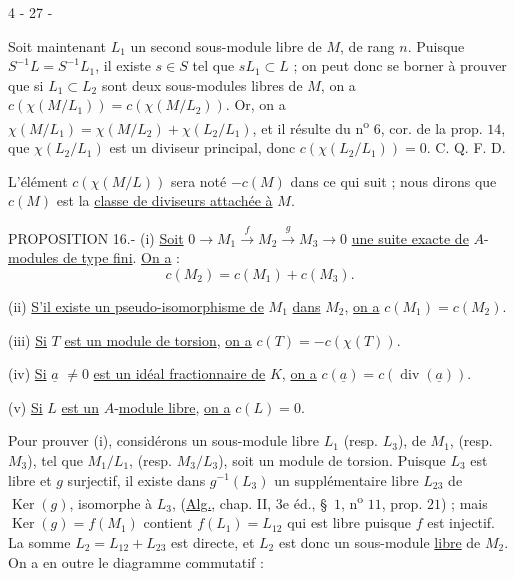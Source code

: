 \begin{center}4 - 27 -\end{center}

Soit maintenant $L_1$ un second sous-module libre de $M$, de rang $n$. Puisque $S^{-1}L=S^{-1}L_1$, il existe $s\in S$ tel que $sL_1\subset L$ ; on peut donc se borner à prouver que si $L_1\subset L_2$ sont deux sous-modules libres de $M$, on a $c(\chi(M/L_1))=c(\chi(M/L_2))$. Or, on a $\chi(M/L_1)=\chi(M/L_2)+\chi(L_2/L_1)$, et il résulte du n\textsuperscript{o} $6$, cor. de la prop. $14$, que $\chi(L_2/L_1)$ est un diviseur principal, donc $c(\chi(L_2/L_1))=0$. C. Q. F. D.

L'élément $c(\chi(M/L))$ sera noté $-c(M)$ dans ce qui suit ; nous dirons que $c(M)$ est la \uline{classe de diviseurs attachée à} $M$.

PROPOSITION 16.- (i) \uline{Soit} $0\longrightarrow M_1\xrightarrow{f}M_2\xrightarrow{g}M_3\longrightarrow0$ \uline{une suite exacte de} $A$-\uline{modules de type fini}. \uline{On a} :
\[
 c(M_2)=c(M_1)+c(M_3).
\]

(ii) \uline{S'il existe un pseudo-isomorphisme de} $M_1$ \uline{dans} $M_2$, \uline{on a} $c(M_1)=c(M_2)$.

(iii) \uline{Si} $T$ \uline{est un module de torsion}, \uline{on a} $c(T)=-c(\chi(T))$.

(iv) \uline{Si} $\underline a$ $\ne0$ \uline{est un idéal fractionnaire de} $K$, \uline{on a} $c(\underline a)=c(\operatorname{div}(\underline a))$.

(v) \uline{Si} $L$ \uline{est un} $A$-\uline{module libre}, \uline{on a} $c(L)=0$.

Pour prouver (i), considérons un sous-module libre $L_1$ (resp. $L_3$), de $M_1$, (resp. $M_3$), tel que $M_1/L_1$, (resp. $M_3/L_3$), soit un module de torsion. Puisque $L_3$ est libre et $g$ surjectif, il existe dans $g^{-1}(L_3)$ un supplémentaire libre $L_{23}$ de $\operatorname{Ker}(g)$, isomorphe à $L_3$, (\uline{Alg.}, chap. II, 3e éd., \S\ $1$, n\textsuperscript{o} $11$, prop. $21$) ; mais $\operatorname{Ker}(g)=f(M_1)$ contient $f(L_1)=L_{12}$ qui est libre puisque $f$ est injectif. La somme $L_2=L_{12}+L_{23}$ est directe, et $L_2$ est donc un sous-module \uline{libre} de $M_2$. On a en outre le diagramme commutatif :
